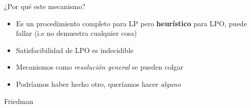 \documentclass{beamer}
\begin{document}
\begin{frame}{¿Por qué este mecanismo?}
    \begin{itemize}
        \item Es un procedimiento completo para LP pero \textbf{heurístico} para LPO, puede fallar (i.e no demuestra cualquier cosa)
        \item Satisfacibilidad de LPO es indecidible
        \item Mecanismos como \textit{resolución general} se pueden colgar
        \item Podríamos haber hecho otro, queríamos hacer \textit{alguno}
    \end{itemize}
    
\end{frame}




    

\begin{frame}{Friedman}
    \begin{figure}
    \centering
\end{figure}
\end{frame}
\end{document}
